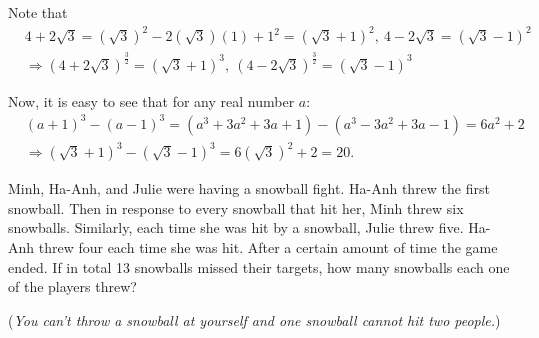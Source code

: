 \documentclass{article}
\begin{document}
\begin{soln}
    Note that 
    \[
        \begin{aligned}
            &4+2\sqrt{3} = (\sqrt{3})^2 - 2(\sqrt{3})(1) + 1^2 = (\sqrt{3}+1)^2,\ 4-2\sqrt{3} = (\sqrt{3}-1)^2\\
            &\Rightarrow \left(4 + 2\sqrt{3}\right)^{\frac{3}{2}} = (\sqrt{3}+1)^3,\ \left(4 - 2\sqrt{3}\right)^{\frac{3}{2}} = (\sqrt{3}-1)^3
        \end{aligned}
    \]

    Now, it is easy to see that for any real number $a:$
    \[
        \begin{aligned}
            &(a+1)^3 - (a-1)^3 = (a^3 + 3a^2 + 3a + 1) - (a^3 - 3a^2 + 3a - 1) = 6a^2+2\\
            &\Rightarrow (\sqrt{3}+1)^3 - (\sqrt{3}-1)^3 = 6(\sqrt{3})^2 + 2 = \boxed{20.}
        \end{aligned}
    \]
\end{soln}

\begin{problem}
    Minh, Ha-Anh, and Julie were having a snowball fight.
    Ha-Anh threw the first snowball. Then in response to every snowball that hit her, Minh threw six snowballs.
    Similarly, each time she was hit by a snowball, Julie threw five. Ha-Anh threw four each time she was hit.
    After a certain amount of time the game ended.
    If in total 13 snowballs missed their targets, how many snowballs each one of the players threw?

    (\textit{You can't throw a snowball at yourself and one snowball cannot hit two people.})
\end{problem}
\end{document}
